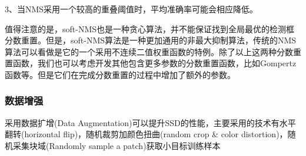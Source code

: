 3、当NMS采用一个较高的重叠阈值时，平均准确率可能会相应降低。

值得注意的是，soft-NMS也是一种贪心算法，并不能保证找到全局最优的检测框分数重置。但是，soft-NMS算法是一种更加通用的非最大抑制算法，传统的NMS算法可以看做是它的一个采用不连续二值权重函数的特例。除了以上这两种分数重置函数，我们也可以考虑开发其他包含更多参数的分数重置函数，比如Gompertz函数等。但是它们在完成分数重置的过程中增加了额外的参数。
\subsubsection{数据增强}
采用数据扩增(Data Augmentation)可以提升SSD的性能，主要采用的技术有水平翻转(horizontal flip)，随机裁剪加颜色扭曲(random crop \& color distortion)，随机采集块域(Randomly sample a patch)获取小目标训练样本